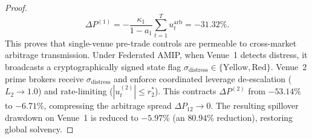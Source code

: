 \documentclass[11pt,a4paper]{article}
\theoremstyle{definition}\newtheorem{definition}[theorem]{Definition}
\theoremstyle{remark}\newtheorem{remark}[theorem]{Remark}
\begin{document}
\begin{proof}
\begin{equation}
\Delta P^{(1)} = - \frac{\kappa_1}{1 - a_1} \sum_{t=1}^T u_t^{\text{arb}} = -31.32\%.
\end{equation}
This proves that single-venue pre-trade controls are permeable to cross-market arbitrage transmission.
Under Federated AMIP, when Venue~1 detects distress, it broadcasts a cryptographically signed state flag $\sigma_{\text{distress}} \in \{\text{Yellow}, \text{Red}\}$. Venue~2 prime brokers receive $\sigma_{\text{distress}}$ and enforce coordinated leverage de-escalation ($L_2 \to 1.0$) and rate-limiting ($|u_t^{(2)}| \le r_2^*$).
This contracts $\Delta P^{(2)}$ from $-53.14\%$ to $-6.71\%$, compressing the arbitrage spread $\Delta P_{12} \to 0$. The resulting spillover drawdown on Venue~1 is reduced to $-5.97\%$ (an $80.94\%$ reduction), restoring global solvency.
\end{proof}
\end{document}

